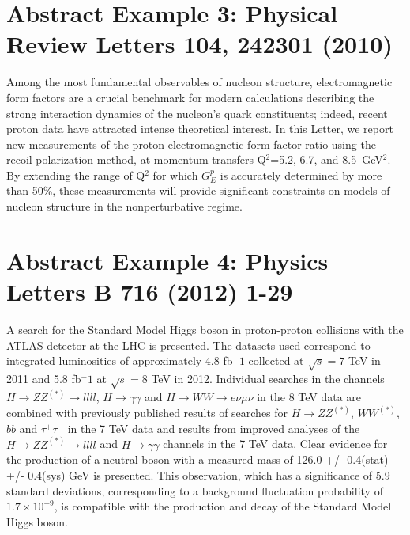 \documentclass{article}
\begin{document}
\section{Abstract Example 3: Physical Review Letters 104, 242301 (2010)}
Among the most fundamental observables of nucleon structure, electromagnetic
form factors are a crucial benchmark for modern calculations describing the
strong interaction dynamics of the nucleon's quark constituents; indeed,
recent proton data have attracted intense theoretical interest. In this
Letter, we report new measurements of the proton electromagnetic form factor
ratio using the recoil polarization method, at momentum transfers 
Q$^2$=5.2, 6.7, and 8.5~GeV$^2$. By extending the range of Q$^2$ for which
$G_E^p$ is accurately determined by more than 50\%, these measurements will
provide significant constraints on models of nucleon structure in the
nonperturbative regime.

\section{Abstract Example 4: Physics Letters B 716 (2012) 1-29}

A search for the Standard Model Higgs boson in proton-proton collisions with the ATLAS detector at the LHC is presented. The datasets used correspond to integrated luminosities of approximately 4.8 fb$^-1$ collected at $\sqrt{s} = 7$ TeV in 2011 and 5.8 fb$^-1$ at $\sqrt{s} = 8$ TeV in 2012. Individual searches in the channels $H \rightarrow ZZ^{(*)}\rightarrow llll$, $H\rightarrow\gamma \gamma$ and $H\rightarrow WW \rightarrow e \nu \mu \nu$ in the 8 TeV data are combined with previously published results of searches for $H\rightarrow ZZ^{(*)}$, $WW^{(*)}$, $b\bar{b}$ and $\tau^+\tau^-$ in the 7 TeV data and results from improved analyses of the $H\rightarrow ZZ^{(*)}\rightarrow llll$ and $H\rightarrow \gamma \gamma$ channels in the 7 TeV data. Clear evidence for the production of a neutral boson with a measured mass of 126.0 +/- 0.4(stat) +/- 0.4(sys) GeV is presented. This observation, which has a significance of 5.9 standard deviations, corresponding to a background fluctuation probability of $1.7\times 10^{-9}$, is compatible with the production and decay of the Standard Model Higgs boson.
\end{document}
